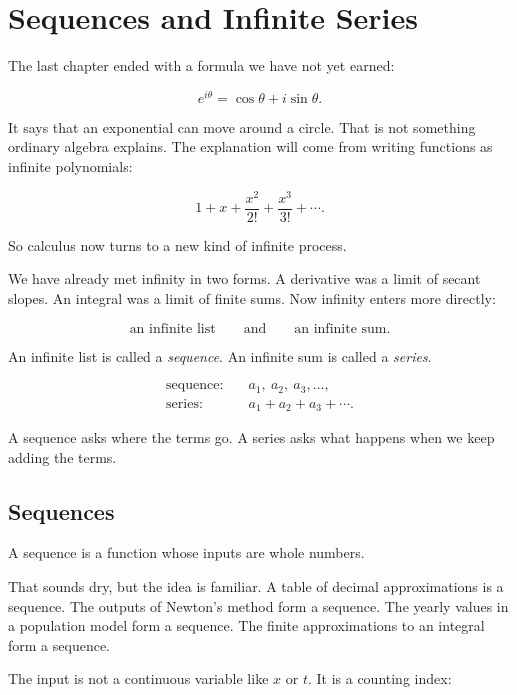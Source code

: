 
\chapter{Sequences and Infinite Series}
\label{chap:sequences-infinite-series}

The last chapter ended with a formula we have not yet earned:

\[
e^{i\theta}=\cos\theta+i\sin\theta.
\]

It says that an exponential can move around a circle.  That is not something ordinary
algebra explains.  The explanation will come from writing functions as infinite
polynomials:

\[
1+x+\frac{x^2}{2!}+\frac{x^3}{3!}+\cdots.
\]

So calculus now turns to a new kind of infinite process.

We have already met infinity in two forms.  A derivative was a limit of secant slopes.
An integral was a limit of finite sums.  Now infinity enters more directly:

\[
\text{an infinite list}
\qquad\text{and}\qquad
\text{an infinite sum}.
\]

An infinite list is called a \emph{sequence}.  An infinite sum is called a \emph{series}.

\[
\begin{aligned}
\text{sequence:} \quad & a_1,\ a_2,\ a_3,\ldots,\\
\text{series:} \quad & a_1+a_2+a_3+\cdots.
\end{aligned}
\]

A sequence asks where the terms go.  A series asks what happens when we keep adding
the terms.

\section{Sequences}
\label{sec:sequences}

A sequence is a function whose inputs are whole numbers.

That sounds dry, but the idea is familiar.  A table of decimal approximations is a
sequence.  The outputs of Newton's method form a sequence.  The yearly values in a
population model form a sequence.  The finite approximations to an integral form a
sequence.

The input is not a continuous variable like \(x\) or \(t\).  It is a counting index:

